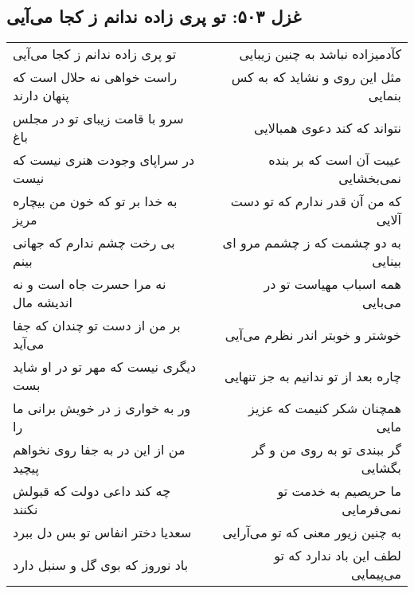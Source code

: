 \begin{center}
\section*{غزل ۵۰۳: تو پری زاده ندانم ز کجا می‌آیی}
\label{sec:503}
\begin{longtable}{l p{0.5cm} r}
تو پری زاده ندانم ز کجا می‌آیی
&&
کآدمیزاده نباشد به چنین زیبایی
\\
راست خواهی نه حلال است که پنهان دارند
&&
مثل این روی و نشاید که به کس بنمایی
\\
سرو با قامت زیبای تو در مجلس باغ
&&
نتواند که کند دعوی همبالایی
\\
در سراپای وجودت هنری نیست که نیست
&&
عیبت آن است که بر بنده نمی‌بخشایی
\\
به خدا بر تو که خون من بیچاره مریز
&&
که من آن قدر ندارم که تو دست آلایی
\\
بی رخت چشم ندارم که جهانی بینم
&&
به دو چشمت که ز چشمم مرو ای بینایی
\\
نه مرا حسرت جاه است و نه اندیشه مال
&&
همه اسباب مهیاست تو در می‌بایی
\\
بر من از دست تو چندان که جفا می‌آید
&&
خوشتر و خوبتر اندر نظرم می‌آیی
\\
دیگری نیست که مهر تو در او شاید بست
&&
چاره بعد از تو ندانیم به جز تنهایی
\\
ور به خواری ز در خویش برانی ما را
&&
همچنان شکر کنیمت که عزیز مایی
\\
من از این در به جفا روی نخواهم پیچید
&&
گر ببندی تو به روی من و گر بگشایی
\\
چه کند داعی دولت که قبولش نکنند
&&
ما حریصیم به خدمت تو نمی‌فرمایی
\\
سعدیا دختر انفاس تو بس دل ببرد
&&
به چنین زیور معنی که تو می‌آرایی
\\
باد نوروز که بوی گل و سنبل دارد
&&
لطف این باد ندارد که تو می‌پیمایی
\\
\end{longtable}
\end{center}
